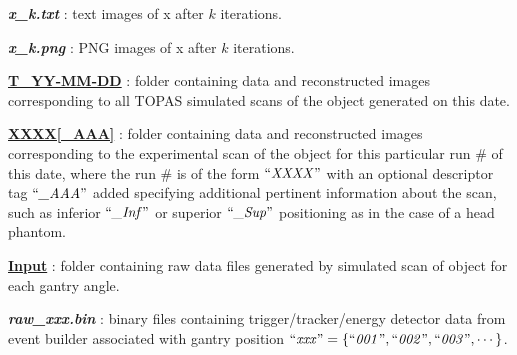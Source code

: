 \documentclass[landscape]{article}
\begin{document}
\begin{myEnumerate}[labelindent=0pt, leftmargin=*]
\begin{myEnumerate}[labelindent=1pt, leftmargin=*]
\begin{myEnumerate}[labelindent=1pt, leftmargin=*]
\begin{myEnumerate}[labelindent=1pt, leftmargin=*]
\begin{myEnumerate}[labelindent=1pt, leftmargin=*]
\begin{myEnumerate}[labelindent=1pt, leftmargin=*]
\begin{myEnumerate}[labelindent=1pt, leftmargin=*]
\begin{myEnumerate}[labelindent=1pt, leftmargin=*]
\begin{myEnumerate}[labelindent=1pt, leftmargin=*]
\begin{myEnumerate}[labelindent=1pt, leftmargin=*]
\begin{myEnumerate}[labelindent=1pt, leftmargin=*]
                                                \item \textbf{\textit{x\_k.txt}} : text images of x after $k$ iterations.
                                                \item \textbf{\textit{x\_k.png}} : PNG images of x after $k$ iterations.
                                            \end{myEnumerate}
                                    \end{myEnumerate}
                                \end{myEnumerate}
                            \end{myEnumerate}
                        \end{myEnumerate}
                    \end{myEnumerate}
                \end{myEnumerate}
            \end{myEnumerate}
            \item \ul{\textbf{T\_YY-MM-DD}} : folder containing data and reconstructed images corresponding to all TOPAS simulated scans of the object generated on this date.
            \begin{myEnumerate}[labelindent=1pt, leftmargin=*]
                \item \ul{\textbf{XXXX[\_AAA]}} : folder containing data and reconstructed images corresponding to the experimental scan of the object for this particular run \# of this date, where the run \# is of the form $\textrm{``\textit{XXXX}''}$ with an optional descriptor tag $\textrm{``\textit{\_AAA}''}$ added specifying additional pertinent information about the scan, such as inferior $\textrm{``\textit{\_Inf}''}$ or superior $\textrm{``\textit{\_Sup}''}$ positioning as in the case of a head phantom.
                \begin{myEnumerate}[labelindent=1pt, leftmargin=*]
                    \item \ul{\textbf{Input}} : folder containing raw data files generated by simulated scan of object for each gantry angle.
                    \begin{myEnumerate}[labelindent=1pt, leftmargin=*]
                        \item \textbf{\textit{raw\_xxx.bin}} : binary files containing trigger/tracker/energy detector data from event builder associated with gantry position $\textrm{``\textit{xxx}''} =\{\textrm{``\textit{001}''}, \textrm{``\textit{002}''}, \textrm{``\textit{003}''}, \cdots\}$.

\end{myEnumerate}
\end{myEnumerate}
\end{myEnumerate}
\end{myEnumerate}
\end{myEnumerate}
\end{myEnumerate}
\end{document}
